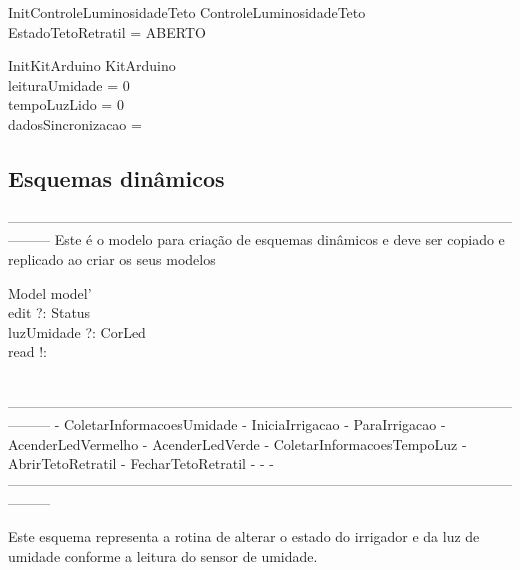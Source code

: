             \begin{schema}{InitControleLuminosidadeTeto}
                \Delta ControleLuminosidadeTeto \\
            \where
                EstadoTetoRetratil = ABERTO \\
            \end{schema}

            \begin{schema}{InitKitArduino}
                \Delta KitArduino \\
            \where
                leituraUmidade = 0\\
                tempoLuzLido  = 0\\
                dadosSincronizacao = \emptyset \\
            \end{schema}

        \subsection{Esquemas dinâmicos}
            ---------------------------------------------------------------------------------------------------------------------
            Este é o modelo para criação de esquemas dinâmicos e deve ser copiado e replicado ao criar os seus modelos
            \begin{schema}{Model}
                \Delta model' \\
                edit ?: Status \\
                luzUmidade ?: CorLed \\
                read !: \nat \\                
            \where
                \\
            \end{schema}
            ---------------------------------------------------------------------------------------------------------------------
                - ColetarInformacoesUmidade
                - IniciaIrrigacao
                - ParaIrrigacao
                - AcenderLedVermelho
                - AcenderLedVerde
                - ColetarInformacoesTempoLuz
                - AbrirTetoRetratil
                - FecharTetoRetratil
                - 
                - 
                - 
            ---------------------------------------------------------------------------------------------------------------------            


            Este esquema representa a rotina de alterar o estado do irrigador e da luz de umidade conforme a leitura do sensor de umidade.

